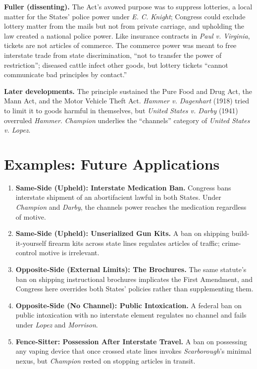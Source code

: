\documentclass[12pt]{article}
\begin{document}
\textbf{Fuller (dissenting).} The Act's avowed purpose was to suppress lotteries, a local matter for the States' police power under \textit{E. C. Knight}; Congress could exclude lottery matter from the mails but not from private carriage, and upholding the law created a national police power. Like insurance contracts in \textit{Paul v. Virginia}, tickets are not articles of commerce. The commerce power was meant to free interstate trade from state discrimination, ``not to transfer the power of restriction''; diseased cattle infect other goods, but lottery tickets ``cannot communicate bad principles by contact.''

\textbf{Later developments.} The principle sustained the Pure Food and Drug Act, the Mann Act, and the Motor Vehicle Theft Act. \textit{Hammer v. Dagenhart} (1918) tried to limit it to goods harmful in themselves, but \textit{United States v. Darby} (1941) overruled \textit{Hammer}. \textit{Champion} underlies the ``channels'' category of \textit{United States v. Lopez}.

\section{Examples: Future Applications}

\begin{enumerate}
\item \textbf{Same-Side (Upheld): Interstate Medication Ban.} Congress bans interstate shipment of an abortifacient lawful in both States. Under \textit{Champion} and \textit{Darby}, the channels power reaches the medication regardless of motive.
\item \textbf{Same-Side (Upheld): Unserialized Gun Kits.} A ban on shipping build-it-yourself firearm kits across state lines regulates articles of traffic; crime-control motive is irrelevant.
\item \textbf{Opposite-Side (External Limits): The Brochures.} The same statute's ban on shipping instructional brochures implicates the First Amendment, and Congress here overrides both States' policies rather than supplementing them.
\item \textbf{Opposite-Side (No Channel): Public Intoxication.} A federal ban on public intoxication with no interstate element regulates no channel and fails under \textit{Lopez} and \textit{Morrison}.
\item \textbf{Fence-Sitter: Possession After Interstate Travel.} A ban on possessing any vaping device that once crossed state lines invokes \textit{Scarborough}'s minimal nexus, but \textit{Champion} rested on stopping articles in transit.
\end{enumerate}
\end{document}
